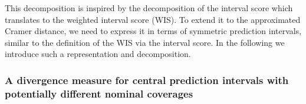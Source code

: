 \documentclass[
]{article}
\begin{document}
This decomposition is inspired by the decomposition of the interval
score which translates to the weighted interval score (WIS). To extend
it to the approximated Cramer distance, we need to express it in terms
of symmetric prediction intervals, similar to the definition of the WIS
via the interval score. In the following we introduce such a
representation and decomposition.

\hypertarget{a-divergence-measure-for-central-prediction-intervals-with-potentially-different-nominal-coverages}{%
\subsubsection{A divergence measure for central prediction intervals
with potentially different nominal
coverages}\label{a-divergence-measure-for-central-prediction-intervals-with-potentially-different-nominal-coverages}}
\end{document}

